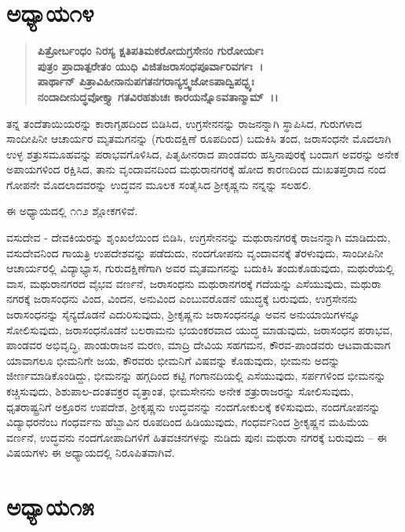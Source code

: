\section*{ಅಧ್ಯಾಯ\enginline{-}೧೪}

\begin{verse}
\textbf{ಪಿತ್ರೋರ್ಬಂಧಂ ನಿರಸ್ಯ ಕ್ಷತಿಪತಿಮಕರೋದುಗ್ರಸೇನಂ ಗುರೋರ್ಯಃ}\\\textbf{ಪುತ್ರಂ ಪ್ರಾದಾತ್ಪರೇತಂ ಯುಧಿ ವಿಜಿತಜರಾಸಂಧಪೂರ್ವಾರಿವರ್ಗಃ~।}\\\textbf{ಪಾರ್ಥಾನ್ ಪಿತ್ರಾವಿಹೀನಾನುಪಗತನಗರಾನ್ಯಸ್ತ್ವಜೋಽಪಾದ್ವಿಪದ್ಭ್ಯಃ}\\\textbf{ನಂದಾದೀನುದ್ಧವೋಕ್ತ್ಯಾ ಗತವಿರಹಶುಚಃ ಕಾರಯನ್ನೊಽವತಾನ್ಮಾಮ್~।।}
\end{verse}

ತನ್ನ ತಂದೆತಾಯಿಯರನ್ನು ಕಾರಾಗೃಹದಿಂದ ಬಿಡಿಸಿದ, ಉಗ್ರಸೇನನನ್ನು ರಾಜನನ್ನಾಗಿ ಸ್ಥಾಪಿಸಿದ, ಗುರುಗಳಾದ ಸಾಂದೀಪಿನೀ ಆಚಾರ್ಯರ ಮೃತಮಗನನ್ನು (ಗುರುದಕ್ಷಿಣೆ ರೂಪದಿಂದ) ಬದುಕಿಸಿ ತಂದ, ಜರಾಸಂಧನೇ ಮೊದಲಾಗಿ ಉಳ್ಳ ಶತ್ರುಸಮೂಹವನ್ನು ಪರಾಭವಗೊಳಿಸಿದ, ಪಿತೃಹೀನರಾದ ಪಾಂಡವರು ಹಸ್ತಿನಾಪುರಕ್ಕೆ ಬಂದಾಗ ಅವರನ್ನು ಅನೇಕ ಅಪಾಯಗಳಿಂದ ರಕ್ಷಿಸಿದ, ತಾನು ವೃಂದಾವನದಿಂದ ಮಥುರಾನಗರಕ್ಕೆ ಹೋದ ಕಾರಣದಿಂದ ದುಃಖತಪ್ತರಾದ ನಂದ ಗೋಪನೇ ಮೊದಲಾದವರನ್ನು ಉದ್ಧವನ ಮೂಲಕ ಸಂತೈಸಿದ ಶ‍್ರೀಕೃಷ್ಣನು ನನ್ನನ್ನು ಸಲಹಲಿ.

ಈ ಅಧ್ಯಾಯದಲ್ಲಿ ೧೧೨ ಶ್ಲೋಕಗಳಿವೆ.

ವಸುದೇವ - ದೇವಕಿಯರನ್ನು ಶೃಂಖಲೆಯಿಂದ ಬಿಡಿಸಿ, ಉಗ್ರಸೇನನನ್ನು ಮಥುರಾನಗರಕ್ಕೆ ರಾಜನನ್ನಾಗಿ ಮಾಡಿದುದು, ವಸುದೇವನಿಂದ ಗಾಯತ್ರಿ ಉಪದೇಶವನ್ನು ಪಡೆದುದು, ನಂದಗೋಪನು ವೃಂದಾವನಕ್ಕೆ ತೆರಳುವುದು, ಸಾಂದೀಪಿನೀ ಆಚಾರ್ಯರಲ್ಲಿ ವಿದ್ಯಾಭ್ಯಾಸ, ಗುರುದಕ್ಷಿಣೆಗಾಗಿ ಅವರ ಮೃತಮಗನನ್ನು ಬದುಕಿಸಿ ತಂದುಕೊಡುವುದು, ಮಥುರೆಯಲ್ಲಿ ವಾಸ, ಮಥುರಾನಗರದ ವೈಭವ ವರ್ಣನೆ, ಜರಾಸಂಧನು ಮಥುರಾನಗರಕ್ಕೆ ಗದೆಯನ್ನು ಎಸೆಯುವುದು, ಮಥುರಾ ನಗರಕ್ಕೆ ಜರಾಸಂಧನು ವಿಂದ, ವಿಂದನ, ಅನುವಿಂದ ಎಂಬುವರೊಡನೆ ಯುದ್ಧಕ್ಕೆ ಬರುವುದು, ಉಗ್ರಸೇನನು ಜರಾಸಂಧನನ್ನು ಸೈನ್ಯದೊಡನೆ ಎದುರಿಸುವುದು, ಶ‍್ರೀಕೃಷ್ಣನು ಜರಾಸಂಧನನ್ನೂ ಅವನ ಅನುಯಾಯಿಗಳನ್ನೂ ಸೋಲಿಸುವುದು, ಜರಾಸಂಧನೊಡನೆ ಬಲರಾಮನು ಭಯಂಕರವಾದ ಯುದ್ಧ ಮಾಡುವುದು, ಜರಾಸಂಧನ ಪರಾಭವ, ಪಾಂಡವರ ಅಭಿವೃದ್ಧಿ, ಪಾಂಡುರಾಜನ ಮರಣ, ಮಾದ್ರಿ ದೇವಿಯ ಸಹಗಮನ, ಕೌರವ-ಪಾಂಡವರು ಆಟವಾಡುವಾಗ ಯಾವಾಗಲೂ ಭೀಮನಿಗೇ ಜಯ, ಕೌರವರು ಭೀಮನಿಗೆ ವಿಷವನ್ನು ಕೊಡುವುದು, ಭೀಮನು ಅದನ್ನು ಜೀರ್ಣಮಾಡಿಕೊಂಡಿದ್ದು, ಭೀಮನನ್ನು ಹಗ್ಗದಿಂದ ಕಟ್ಟಿ ಗಂಗಾನದಿಯಲ್ಲಿ ಎಸೆಯುವುದು, ಸರ್ಪಗಳಿಂದ ಭೀಮನನ್ನು ಕಚ್ಚಿಸುವುದು, ಶಿಶುಪಾಲ-ದಂತವಕ್ರರ ವೃತ್ತಾಂತ, ಭೀಮಸೇನನು ಅನೇಕ ಶತ್ರುರಾಜರನ್ನು ಸೋಲಿಸುವುದು, ಧೃತರಾಷ್ಟ್ರನಿಗೆ ಅಕ್ರೂರನ ಉಪದೇಶ, ಶ‍್ರೀಕೃಷ್ಣನು ಉದ್ಧವನನ್ನು ನಂದಗೋಕುಲಕ್ಕೆ ಕಳಿಸುವುದು, ನಂದಗೋಪನನ್ನು ವಿದ್ಯಾಧರನೆಂಬ ಗಂಧರ್ವನು ಹೆಬ್ಬಾವಿನ ರೂಪದಿಂದ ಹಿಡಿಯುವುದು, ಗಂಧರ್ವನಿಂದ ಶ‍್ರೀಕೃಷ್ಣನ ಮಹಿಮೆಯ ವರ್ಣನೆ, ಉದ್ಧವನು ನಂದಗೋಪಾದಿಗಳಿಗೆ ಹಿತವಚನಗಳನ್ನು ನುಡಿದು ಪುನಃ ಮಥುರಾ ನಗರಕ್ಕೆ ಬರುವುದು – ಈ ವಿಷಯಗಳು ಈ ಅಧ್ಯಾಯದಲ್ಲಿ ನಿರೂಪಿತವಾಗಿವೆ.


\section*{ಅಧ್ಯಾಯ\enginline{-}೧೫}

